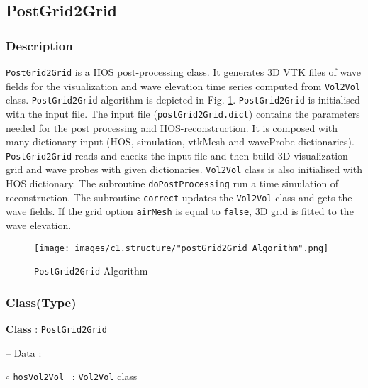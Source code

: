 \pagebreak
	\subsection{PostGrid2Grid}
	
	\label{chap:postGrid2Grid}

	\subsubsection{Description}
	
	\texttt{PostGrid2Grid} is a HOS post-processing class. It generates 3D VTK files of wave fields for the visualization and wave elevation time series computed from \texttt{Vol2Vol} class. \texttt{PostGrid2Grid} algorithm is depicted in Fig. \ref{fig:postGrid2GridAlgorighm}. \texttt{PostGrid2Grid} is initialised with the input file. The input file (\texttt{postGrid2Grid.dict}) contains the parameters needed for the post processing and HOS-reconstruction. It is composed with many dictionary input (HOS, simulation, vtkMesh and waveProbe dictionaries). \texttt{PostGrid2Grid} reads and checks the input file and then build 3D visualization grid and wave probes with given dictionaries. \texttt{Vol2Vol} class is also initialised with HOS dictionary. The subroutine \texttt{doPostProcessing} run a time simulation of reconstruction. The subroutine \texttt{correct} updates the \texttt{Vol2Vol} class and gets the wave fields. If the grid option \texttt{airMesh} is equal to \texttt{false}, 3D grid is fitted to the wave elevation. 
	
	\vspace{0.2cm}
	
	{
		\begin{figure} [H]
			\centering
			\texttt{[image: images/c1.structure/"postGrid2Grid\_Algorithm".png]}
			\vspace{0.5cm}
			\caption{\texttt{PostGrid2Grid} Algorithm}
			\label{fig:postGrid2GridAlgorighm}
		\end{figure}
	}	
	
	\pagebreak
	\subsubsection{Class(Type)}	
	
	\textbf{Class} : \texttt{PostGrid2Grid}
	
	\hspace{0.5 cm} -- Data :
	
	\hspace{1.0 cm} $\circ$ \texttt{hosVol2Vol\_} : \texttt{Vol2Vol} class
	

